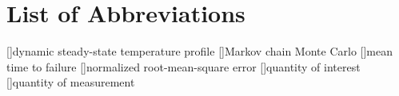 \chapter*{List of Abbreviations}

\begin{acronym}[NRMSE]
[]{dynamic steady-state temperature profile}
[]{Markov chain Monte Carlo}
[]{mean time to failure}
[]{normalized root-mean-square error}
[]{quantity of interest}
[]{quantity of measurement}
\end{acronym}
